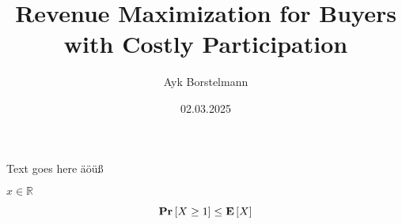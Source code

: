 \documentclass[11pt,a4paper]{article}
\author{Ayk Borstelmann}
\title{Revenue Maximization for Buyers with Costly Participation}
\date{02.03.2025}
\newcommand{\RR}{\ensuremath{\mathbb{R}}}
\renewcommand{\Pr}[1]{\mbox{\rm\bf Pr}\left[#1\right]}
\newcommand{\Ex}[1]{\mbox{\rm\bf E}\left[#1\right]}
\begin{document}
\maketitle

\cite{primary}

Text goes here äöüß

$x \in \RR$

\[
\Pr{X \geq 1} \leq \Ex{X}
\]


\end{document}
